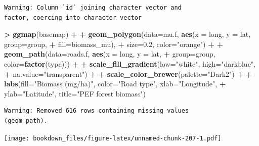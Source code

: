 \documentclass[]{krantz}
\makeatletter
\newenvironment{Shaded}{\begin{snugshade}}{\end{snugshade}}
\newcommand{\KeywordTok}[1]{\textcolor[rgb]{0.27,0.27,0.27}{\textbf{#1}}}
\newcommand{\DataTypeTok}[1]{\textcolor[rgb]{0.27,0.27,0.27}{#1}}
\newcommand{\FloatTok}[1]{\textcolor[rgb]{0.06,0.06,0.06}{#1}}
\newcommand{\StringTok}[1]{\textcolor[rgb]{0.5,0.5,0.5}{#1}}
\newcommand{\OperatorTok}[1]{\textcolor[rgb]{0.43,0.43,0.43}{\textbf{#1}}}
\newcommand{\NormalTok}[1]{#1}
\newenvironment{kframe}{%
\medskip{}
\setlength{\fboxsep}{.8em}
 \def\at@end@of@kframe{}%
 \ifinner\ifhmode%
  \def\at@end@of@kframe{\end{minipage}}%
  \begin{minipage}{\columnwidth}%
 \fi\fi%
 \def\FrameCommand##1{\hskip\@totalleftmargin \hskip-\fboxsep
 \colorbox{shadecolor}{##1}\hskip-\fboxsep
     \hskip-\linewidth \hskip-\@totalleftmargin \hskip\columnwidth}%
 \MakeFramed {\advance\hsize-\width
   \@totalleftmargin\z@ \linewidth\hsize
   \@setminipage}}%
 {\par\unskip\endMakeFramed%
 \at@end@of@kframe}
\renewenvironment{Shaded}{\begin{kframe}}{\end{kframe}}
\makeatother
\begin{document}
\begin{verbatim}
Warning: Column `id` joining character vector and
factor, coercing into character vector
\end{verbatim}

\begin{Shaded}
\begin{Highlighting}[]
\OperatorTok{>}\StringTok{ }\KeywordTok{ggmap}\NormalTok{(basemap) }\OperatorTok{+}
\OperatorTok{+}\StringTok{     }\KeywordTok{geom_polygon}\NormalTok{(}\DataTypeTok{data=}\NormalTok{mu.f, }\KeywordTok{aes}\NormalTok{(}\DataTypeTok{x =}\NormalTok{ long, }\DataTypeTok{y =}\NormalTok{ lat, }\DataTypeTok{group=}\NormalTok{group, }
\OperatorTok{+}\StringTok{                                 }\DataTypeTok{fill=}\NormalTok{biomass_mu), }
\OperatorTok{+}\StringTok{                  }\DataTypeTok{size=}\FloatTok{0.2}\NormalTok{, }\DataTypeTok{color=}\StringTok{"orange"}\NormalTok{) }\OperatorTok{+}
\OperatorTok{+}\StringTok{     }\KeywordTok{geom_path}\NormalTok{(}\DataTypeTok{data=}\NormalTok{roads.f, }\KeywordTok{aes}\NormalTok{(}\DataTypeTok{x =}\NormalTok{ long, }\DataTypeTok{y =}\NormalTok{ lat, }
\OperatorTok{+}\StringTok{                                 }\DataTypeTok{group=}\NormalTok{group, }\DataTypeTok{color=}\KeywordTok{factor}\NormalTok{(type))) }\OperatorTok{+}
\OperatorTok{+}\StringTok{     }\KeywordTok{scale_fill_gradient}\NormalTok{(}\DataTypeTok{low=}\StringTok{"white"}\NormalTok{, }\DataTypeTok{high=}\StringTok{"darkblue"}\NormalTok{, }
\OperatorTok{+}\StringTok{                         }\DataTypeTok{na.value=}\StringTok{"transparent"}\NormalTok{) }\OperatorTok{+}
\OperatorTok{+}\StringTok{     }\KeywordTok{scale_color_brewer}\NormalTok{(}\DataTypeTok{palette=}\StringTok{"Dark2"}\NormalTok{) }\OperatorTok{+}
\OperatorTok{+}\StringTok{     }\KeywordTok{labs}\NormalTok{(}\DataTypeTok{fill=}\StringTok{"Biomass (mg/ha)"}\NormalTok{, }\DataTypeTok{color=}\StringTok{"Road type"}\NormalTok{, }\DataTypeTok{xlab=}\StringTok{"Longitude"}\NormalTok{, }
\OperatorTok{+}\StringTok{          }\DataTypeTok{ylab=}\StringTok{"Latitude"}\NormalTok{, }\DataTypeTok{title=}\StringTok{"PEF forest biomass"}\NormalTok{)}
\end{Highlighting}
\end{Shaded}

\begin{verbatim}
Warning: Removed 616 rows containing missing values
(geom_path).
\end{verbatim}

\texttt{[image: bookdown\_files/figure-latex/unnamed-chunk-207-1.pdf]}
\end{document}
